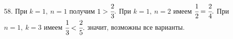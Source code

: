 58. При $k=1,\ n=1$ получим $1>\cfrac{2}{3}.$ При $k=1,\ n=2$ имеем $\cfrac{1}{2}=\cfrac{2}{4}.$ При $n=1,\ k=3$ имеем $\cfrac{1}{3}<\cfrac{2}{5}.$ значит, возможны все варианты.\\
